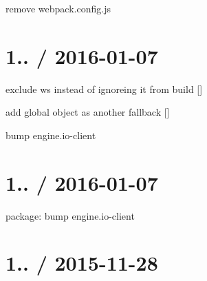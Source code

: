\begin{DoxyItemize}
\item remove {\ttfamily webpack.\+config.\+js}
\end{DoxyItemize}

\section*{1.. / 2016-\/01-\/07 }


\begin{DoxyItemize}
\item exclude {\ttfamily ws} instead of {\ttfamily ignore}ing it from build \mbox{[}\mbox{]}
\item add global object as another fallback \mbox{[}\mbox{]}
\item bump {\ttfamily engine.\+io-\/client}
\end{DoxyItemize}

\section*{1.. / 2016-\/01-\/07 }


\begin{DoxyItemize}
\item package\+: bump {\ttfamily engine.\+io-\/client}
\end{DoxyItemize}

\section*{1.. / 2015-\/11-\/28 }


